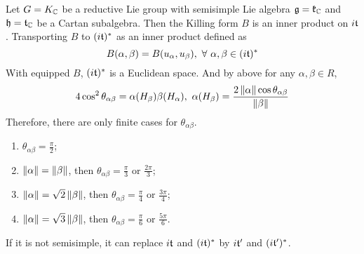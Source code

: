 \documentclass[a4paper,12pt]{article}
\begin{document}
	Let $G = K_{\mathbb{C}}$ be a reductive Lie group with semisimple Lie algebra $\mathfrak{g} = \mathfrak{k}_{\mathbb{C}}$ and $\mathfrak{h} = \mathfrak{t}_{\mathbb{C}}$ be a Cartan subalgebra. Then the Killing form $B$ is an inner product on $i\mathfrak{t}$. Transporting $B$ to $(i\mathfrak{t})^*$ as an inner product defined as
	\begin{equation*}
		B(\alpha,\beta) = B(u_{\alpha},u_{\beta}),~\forall~\alpha,\beta \in (i\mathfrak{t})^*
	\end{equation*}
	With equipped $B$, $(i\mathfrak{t})^{*}$ is a Euclidean space. And by above for any $\alpha, \beta \in R$,
	\begin{equation*}
		4\cos^2 \theta_{\alpha \beta}  = \alpha(H_{\beta})\beta(H_{\alpha}),~\alpha(H_{\beta}) = \frac{2\left\lVert\alpha\right\lVert\cos \theta_{\alpha \beta}}{\left\lVert\beta\right\lVert}
	\end{equation*}
	Therefore, there are only finite cases for $\theta_{\alpha \beta}$.
	\begin{enumerate}
		\item $\theta_{\alpha \beta} = \frac{\pi}{2}$;
		\item $\left\lVert\alpha\right\lVert = \left\lVert\beta\right\lVert$, then $\theta_{\alpha \beta} = \frac{\pi}{3}$ or $\frac{2\pi}{3}$;
		\item $\left\lVert\alpha\right\lVert = \sqrt{2}\left\lVert\beta\right\lVert$, then $\theta_{\alpha \beta} = \frac{\pi}{4}$ or $\frac{3\pi}{4}$;
		\item $\left\lVert\alpha\right\lVert = \sqrt{3}\left\lVert\beta\right\lVert$, then $\theta_{\alpha \beta} = \frac{\pi}{6}$ or $\frac{5\pi}{6}$.
	\end{enumerate}
	If it is not semisimple, it can replace $i\mathfrak{t}$ and $(i\mathfrak{t})^*$ by $i\mathfrak{t^{\prime}}$ and $(i\mathfrak{t^{\prime}})^*$.
\end{document}
